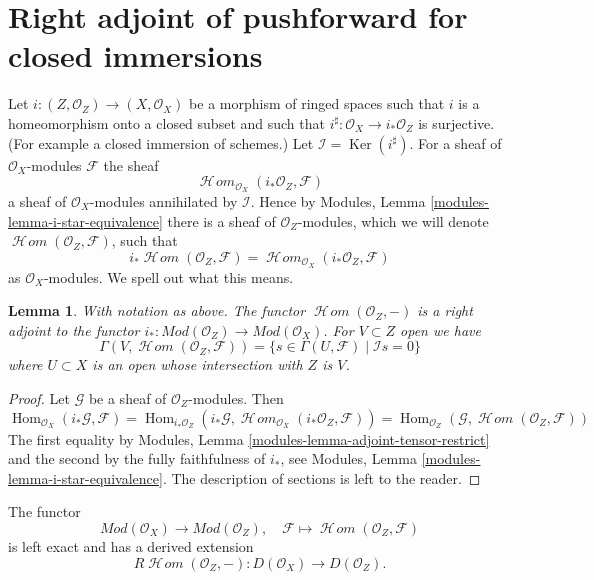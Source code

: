 \documentclass{stacks-project}
\theoremstyle{plain}
\newtheorem{lemma}[subsection]{Lemma}
\theoremstyle{definition}
\theoremstyle{remark}
\numberwithin{equation}{subsection}
\def\Hom{\mathop{\mathrm{Hom}}\nolimits}
\def\SheafHom{\mathop{\mathcal{H}\!\mathit{om}}\nolimits}
\def\Ker{\mathop{\mathrm{Ker}}}
\begin{document}
\section{Right adjoint of pushforward for closed immersions}
\label{section-sections-with-exact-support}

\noindent
Let $i : (Z, \mathcal{O}_Z) \to (X, \mathcal{O}_X)$ be a morphism
of ringed spaces such that $i$ is a homeomorphism onto a closed
subset and such that $i^\sharp : \mathcal{O}_X \to i_*\mathcal{O}_Z$
is surjective. (For example a closed immersion of schemes.)
Let $\mathcal{I} = \Ker(i^\sharp)$. For a sheaf
of $\mathcal{O}_X$-modules $\mathcal{F}$ the sheaf
$$
\SheafHom_{\mathcal{O}_X}(i_*\mathcal{O}_Z, \mathcal{F})
$$
a sheaf of $\mathcal{O}_X$-modules annihilated by $\mathcal{I}$.
Hence by Modules, Lemma \ref{modules-lemma-i-star-equivalence}
there is a sheaf of $\mathcal{O}_Z$-modules,
which we will denote $\SheafHom(\mathcal{O}_Z, \mathcal{F})$,
such that
$$
i_*\SheafHom(\mathcal{O}_Z, \mathcal{F}) =
\SheafHom_{\mathcal{O}_X}(i_*\mathcal{O}_Z, \mathcal{F})
$$
as $\mathcal{O}_X$-modules. We spell out what this means.

\begin{lemma}
\label{lemma-compute-sheaf-with-exact-support}
With notation as above. The functor $\SheafHom(\mathcal{O}_Z, -)$ is a
right adjoint to the functor
$i_* : \textit{Mod}(\mathcal{O}_Z) \to \textit{Mod}(\mathcal{O}_X)$.
For $V \subset Z$ open we have
$$
\Gamma(V, \SheafHom(\mathcal{O}_Z, \mathcal{F})) =
\{s \in \Gamma(U, \mathcal{F}) \mid \mathcal{I}s = 0\}
$$
where $U \subset X$ is an open whose intersection with $Z$ is $V$.
\end{lemma}

\begin{proof}
Let $\mathcal{G}$ be a sheaf of $\mathcal{O}_Z$-modules. Then
$$
\Hom_{\mathcal{O}_X}(i_*\mathcal{G}, \mathcal{F}) =
\Hom_{i_*\mathcal{O}_Z}(i_*\mathcal{G},
\SheafHom_{\mathcal{O}_X}(i_*\mathcal{O}_Z, \mathcal{F})) =
\Hom_{\mathcal{O}_Z}(\mathcal{G}, \SheafHom(\mathcal{O}_Z, \mathcal{F}))
$$
The first equality by
Modules, Lemma \ref{modules-lemma-adjoint-tensor-restrict}
and the second by the fully faithfulness of $i_*$, see
Modules, Lemma \ref{modules-lemma-i-star-equivalence}.
The description of sections is left to the reader.
\end{proof}

\noindent
The functor
$$
\textit{Mod}(\mathcal{O}_X)
\longrightarrow
\textit{Mod}(\mathcal{O}_Z),
\quad
\mathcal{F} \longmapsto \SheafHom(\mathcal{O}_Z, \mathcal{F})
$$
is left exact and has a derived extension
$$
R\SheafHom(\mathcal{O}_Z, -) : D(\mathcal{O}_X) \to D(\mathcal{O}_Z).
$$
\end{document}

